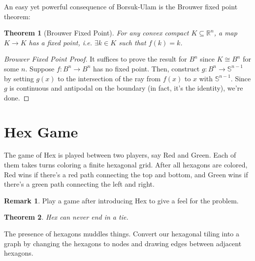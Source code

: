 \documentclass[12pt]{amsart}
\newtheorem{thm}{Theorem}[section]
\theoremstyle{definition}
\newtheorem*{rem}{Remark}
\begin{document}
    An easy yet powerful consequence of Borsuk-Ulam is the Brouwer fixed point theorem:
    \begin{thm}[Brouwer Fixed Point]
        \label{brouwer}
        For any convex compact $K \subseteq \mathbb R^n$, a map $K \to K$ has a fixed point, i.e. $\exists k \in K$ such that $f(k) = k$.
    \end{thm}
    
    \begin{proof}[Brouwer Fixed Point Proof]
        It suffices to prove the result for $B^n$ since $K \cong B^n$ for some $n$. Suppose $f: B^n \to B^n$ has no fixed point. Then, construct $g: B^n \to \mathbb S^{n-1}$ by setting $g(x)$ to the intersection of the ray from $f(x)$ to $x$ with $\mathbb S^{n-1}$. Since $g$ is continuous and antipodal on the boundary (in fact, it's the identity), we're done.
    \end{proof}

    \section{Hex Game}

    The game of Hex is played between two players, say Red and Green. Each of them takes turns coloring a finite hexagonal grid. After all hexagons are colored, Red wins if there's a red path connecting the top and bottom, and Green wins if there's a green path connecting the left and right. 

    \begin{rem}
        Play a game after introducing Hex to give a feel for the problem. 
    \end{rem}

    \begin{thm}
        Hex can never end in a tie.
    \end{thm}
    
    The presence of hexagons muddles things. Convert our hexagonal tiling into a graph by changing the hexagons to nodes and drawing edges between adjacent hexagons.
    
\end{document}
